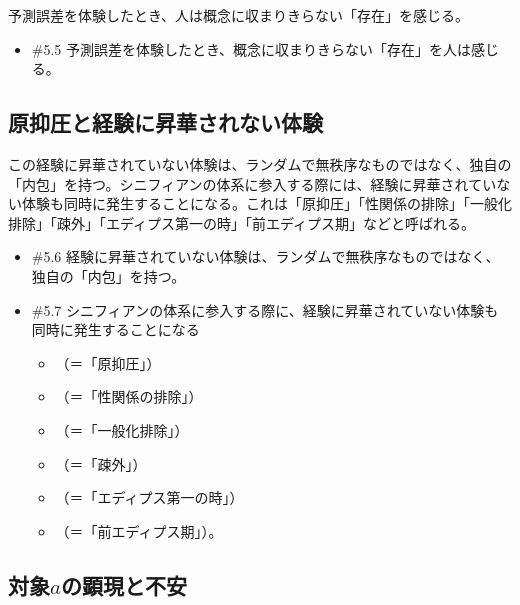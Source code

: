 予測誤差を体験したとき、人は概念に収まりきらない「存在」を感じる。

\begin{note}{}
  \begin{itemize}
    \tightlist
    \item{\#5.5}
      予測誤差を体験したとき、概念に収まりきらない「存在」を人は感じる。
  \end{itemize}
\end{note}

\subsection{原抑圧と経験に昇華されない体験}\label{ux539fux6291ux5727ux3068ux7d4cux9a13ux306bux6607ux83efux3055ux308cux306aux3044ux4f53ux9a13}

この経験に昇華されていない体験は、ランダムで無秩序なものではなく、独自の「内包」を持つ。シニフィアンの体系に参入する際には、経験に昇華されていない体験も同時に発生することになる。これは「原抑圧」「性関係の排除」「一般化排除」「疎外」「エディプス第一の時」「前エディプス期」などと呼ばれる。

\begin{note}{}
  \begin{itemize}
    \tightlist
    \item{\#5.6}
      経験に昇華されていない体験は、ランダムで無秩序なものではなく、独自の「内包」を持つ。
    \item{\#5.7}
      シニフィアンの体系に参入する際に、経験に昇華されていない体験も同時に発生することになる
      \begin{itemize}
          \tightlist
          \item
          （＝「原抑圧」）
          \item
          （＝「性関係の排除」）
          \item
          （＝「一般化排除」）
          \item
          （＝「疎外」）
          \item
          （＝「エディプス第一の時」）  
          \item
          （＝「前エディプス期」）。
        \end{itemize}
  \end{itemize}
\end{note}

\subsection{\texorpdfstring{対象\(a\)の顕現と不安}{対象aの顕現と不安}}\label{ux5bfeux8c61aux306eux9855ux73feux3068ux4e0dux5b89}

